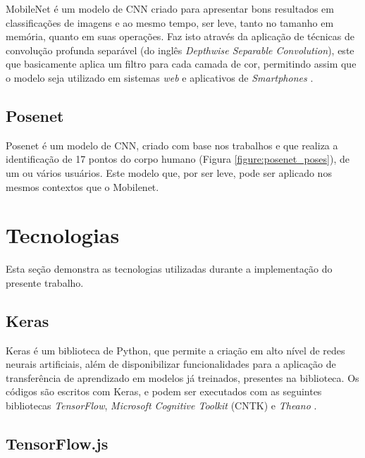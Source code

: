 MobileNet é um modelo de CNN criado para apresentar bons resultados em classificações de imagens e ao mesmo tempo, ser leve, tanto no tamanho em memória, quanto em suas operações. Faz isto através da aplicação de técnicas de convolução profunda separável (do inglês \textit{Depthwise Separable Convolution}), este que basicamente aplica um filtro para cada camada de cor, permitindo assim que o modelo seja utilizado em sistemas \textit{web} e aplicativos de \textit{Smartphones} \cite{howard2017mobilenets}.

\subsection{Posenet}

\par Posenet é um modelo de CNN, criado com base nos trabalhos \cite{george2017} e \cite{george2018} que realiza a identificação de 17 pontos do corpo humano (Figura \ref{figure:posenet_poses}), de um ou vários usuários. Este modelo que, por ser leve, pode ser aplicado nos mesmos contextos que o Mobilenet.


\section{Tecnologias}

Esta seção demonstra as tecnologias utilizadas durante a implementação do presente trabalho.

\subsection{Keras}

Keras é um biblioteca de Python, que permite a criação em alto nível de redes neurais artificiais, além de disponibilizar funcionalidades para a aplicação de transferência de aprendizado em modelos já treinados, presentes na biblioteca. Os códigos são escritos com Keras, e podem ser executados com as seguintes bibliotecas \textit{TensorFlow}, \textit{Microsoft Cognitive Toolkit} (CNTK) e \textit{Theano} \cite{chollet2015}.

\subsection{TensorFlow.js}

